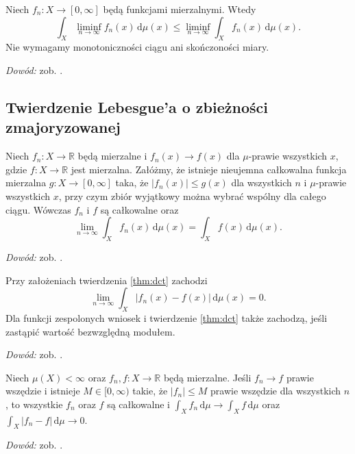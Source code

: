 \begin{twierdzenie}
\label{thm:fatou}
Niech $f_n:X\to[0,\infty]$ będą funkcjami mierzalnymi.
Wtedy
\begin{equation}\label{eq:fatou}
\int_X\liminf_{n\to\infty}f_n(x)\,\mathrm d\mu(x)
\le\liminf_{n\to\infty}\int_Xf_n(x)\,\mathrm d\mu(x).
\end{equation}
Nie wymagamy monotoniczności ciągu ani skończoności miary.
\end{twierdzenie}
\noindent\emph{Dowód:} zob. .

\subsection{Twierdzenie Lebesgue'a o zbieżności zmajoryzowanej}


\begin{twierdzenie}
\label{thm:dct}
Niech $f_n:X\to\mathbb R$ będą mierzalne i
$f_n(x)\to f(x)$ dla $\mu$-prawie wszystkich $x$, gdzie
$f:X\to\mathbb R$ jest mierzalna. Załóżmy, że
istnieje nieujemna całkowalna funkcja mierzalna
$g:X\to[0,\infty]$ taka, że
$|f_n(x)|\le g(x)$ dla wszystkich $n$ i
$\mu$-prawie wszystkich $x$, przy czym zbiór
wyjątkowy można wybrać wspólny dla całego ciągu.
Wówczas $f_n$ i $f$ są całkowalne oraz
\begin{equation}\label{eq:dct}
\lim_{n\to\infty}\int_Xf_n(x)\,\mathrm d\mu(x)
=\int_Xf(x)\,\mathrm d\mu(x).
\end{equation}
\end{twierdzenie}
\noindent\emph{Dowód:} zob. .

\begin{wniosek}
\label{cor:dct-l1}
Przy założeniach twierdzenia \ref{thm:dct} zachodzi
\[
\lim_{n\to\infty}\int_X|f_n(x)-f(x)|\,\mathrm d\mu(x)=0.
\]
Dla funkcji zespolonych wniosek i twierdzenie
\ref{thm:dct} także zachodzą, jeśli zastąpić
wartość bezwzględną modułem.
\end{wniosek}
\noindent\emph{Dowód:} zob. .

\begin{wniosek}
\label{cor:bct}
Niech $\mu(X)<\infty$ oraz $f_n,f:X\to\mathbb R$
będą mierzalne. Jeśli $f_n\to f$ prawie wszędzie
i istnieje $M\in[0,\infty)$ takie, że $|f_n|\le M$
prawie wszędzie dla wszystkich $n$, to wszystkie $f_n$ oraz $f$ są całkowalne i
$\int_X f_n\,\mathrm d\mu\to\int_X f\,\mathrm d\mu$ oraz $\int_X|f_n-f|\,\mathrm d\mu\to0$.
\end{wniosek}
\noindent\emph{Dowód:} zob. .

